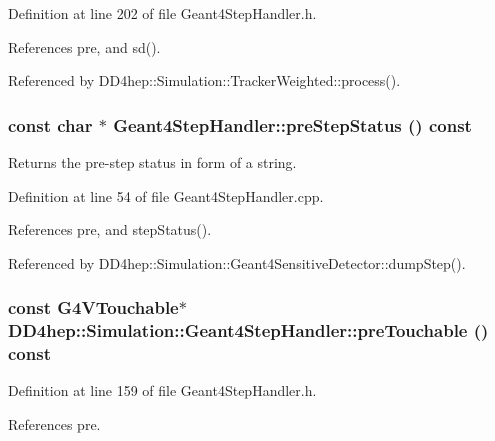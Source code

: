Definition at line 202 of file Geant4StepHandler.h.

References pre, and sd().

Referenced by DD4hep::Simulation::TrackerWeighted::process().\hypertarget{class_d_d4hep_1_1_simulation_1_1_geant4_step_handler_a9e603d8e2f5db29921955409b8fd55be}{
\subsubsection[{preStepStatus}]{\setlength{\rightskip}{0pt plus 5cm}const char $\ast$ Geant4StepHandler::preStepStatus () const}}
\label{class_d_d4hep_1_1_simulation_1_1_geant4_step_handler_a9e603d8e2f5db29921955409b8fd55be}


Returns the pre-\/step status in form of a string. 

Definition at line 54 of file Geant4StepHandler.cpp.

References pre, and stepStatus().

Referenced by DD4hep::Simulation::Geant4SensitiveDetector::dumpStep().\hypertarget{class_d_d4hep_1_1_simulation_1_1_geant4_step_handler_ae808f346ce65f89c398ea839327b5c2f}{
\subsubsection[{preTouchable}]{\setlength{\rightskip}{0pt plus 5cm}const G4VTouchable$\ast$ DD4hep::Simulation::Geant4StepHandler::preTouchable () const}}
\label{class_d_d4hep_1_1_simulation_1_1_geant4_step_handler_ae808f346ce65f89c398ea839327b5c2f}


Definition at line 159 of file Geant4StepHandler.h.

References pre.

